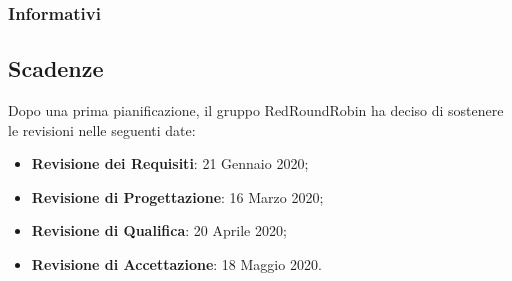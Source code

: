 		\subsubsection{Informativi}
			

	\subsection{Scadenze}
		Dopo una prima pianificazione, il gruppo RedRoundRobin ha deciso di sostenere le revisioni nelle seguenti date:
		\begin{itemize}
			\item \textbf{Revisione dei Requisiti}: 21 Gennaio 2020;
			\item \textbf{Revisione di Progettazione}: 16 Marzo 2020;
			\item \textbf{Revisione di Qualifica}: 20 Aprile 2020;
			\item \textbf{Revisione di Accettazione}: 18 Maggio 2020.
		\end{itemize}
